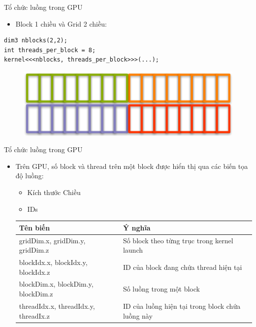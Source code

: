 \documentclass[10pt]{beamer}
\theoremstyle{remark}
\numberwithin{algocf}{section}
\numberwithin{equation}{section}
\numberwithin{dl}{section}
\numberwithin{figure}{section}
\begin{document}
\begin{frame}[fragile]{Tổ chức luồng trong GPU}
    \begin{itemize}
        \item Block 1 chiều và Grid 2 chiều:
    \end{itemize}

    \begin{verbatim}
dim3 nblocks(2,2);
int threads_per_block = 8;
kernel<<<nblocks, threads_per_block>>>(...);
    \end{verbatim}

    \begin{figure}[H]
        \centering
        \includegraphics[width=0.7\linewidth]{figures/CUDA/2d_1d_Grid_Block.png}
    \end{figure}
\end{frame}

\begin{frame}{Tổ chức luồng trong GPU}
    \begin{itemize}
        \item Trên GPU, số block và thread trên một block được hiển thị qua các biến tọa độ luồng:
        \begin{itemize}
            \item Kích thước Chiều
            \item IDs
        \end{itemize}
        \begin{table}[H]
            \centering
            \resizebox{\columnwidth}{!} {
                \begin{tabular}{|l|l|}
                    \hline
                    Tên biến & Ý nghĩa \\
                    \hline
                    gridDim.x, gridDim.y, gridDim.z & Số block theo từng trục trong kernel launch \\
                    \hline
                    blockIdx.x, blockIdx.y, blockIdx.z & ID của block đang chứa thread hiện tại \\
                    \hline
                    blockDim.x, blockDim.y, blockDim.z & Số luồng trong một block \\
                    \hline
                    threadIdx.x, threadIdx.y, threadIx.z & ID của luồng hiện tại trong block chứa luồng này \\
                    \hline
                \end{tabular}
            }
        \end{table}
    \end{itemize}

\end{frame}
\end{document}
